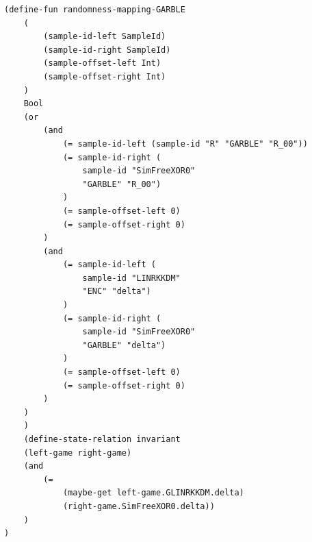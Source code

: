 \begin{longlisting}
\begin{verbatim}
(define-fun randomness-mapping-GARBLE
    (
        (sample-id-left SampleId)
        (sample-id-right SampleId)
        (sample-offset-left Int)
        (sample-offset-right Int)
    )
    Bool
    (or
        (and
            (= sample-id-left (sample-id "R" "GARBLE" "R_00"))
            (= sample-id-right (
                sample-id "SimFreeXOR0" 
                "GARBLE" "R_00")
            )
            (= sample-offset-left 0)
            (= sample-offset-right 0)
        )
        (and
            (= sample-id-left (
                sample-id "LINRKKDM" 
                "ENC" "delta")
            )
            (= sample-id-right (
                sample-id "SimFreeXOR0" 
                "GARBLE" "delta")
            )
            (= sample-offset-left 0)
            (= sample-offset-right 0)
        )
    )
    )
    (define-state-relation invariant
    (left-game right-game) 
    (and
        (= 
            (maybe-get left-game.GLINRKKDM.delta) 
            (right-game.SimFreeXOR0.delta))
    )
)
\end{verbatim}
\caption{Invariant and randomness mapping used in the theorem}
\label{lst:domino-theorem-equivalence-invariant}
\end{longlisting}